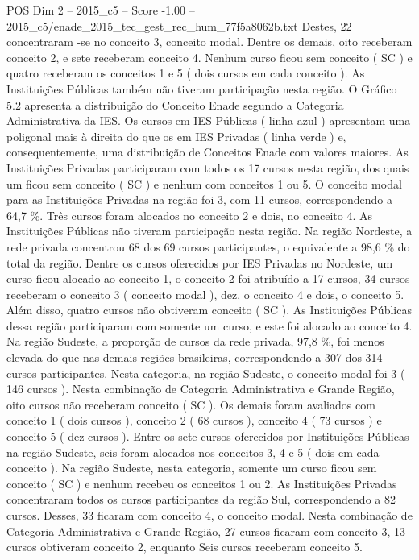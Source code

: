 \begin{textsample}{POS Dim 2 – 2015\_c5 – Score -1.00 – 2015\_c5/enade\_2015\_tec\_gest\_rec\_hum\_77f5a8062b.txt}
Destes, 22 concentraram -se no conceito 3, conceito modal.
Dentre os demais, oito receberam conceito 2, e sete receberam conceito 4.
Nenhum curso ficou sem conceito ( SC ) e quatro receberam os conceitos 1 e 5 ( dois cursos em cada conceito ).
As Instituições Públicas também não tiveram participação nesta região.
O Gráfico 5.2 apresenta a distribuição do Conceito Enade segundo a Categoria Administrativa da IES.
Os cursos em IES Públicas ( linha azul ) apresentam uma poligonal mais à direita do que os em IES Privadas ( linha verde ) e, consequentemente, uma distribuição de Conceitos Enade com valores maiores.
As Instituições Privadas participaram com todos os 17 cursos nesta região, dos quais um ficou sem conceito ( SC ) e nenhum com conceitos 1 ou 5.
O conceito modal para as Instituições Privadas na região foi 3, com 11 cursos, correspondendo a 64,7 \%.
Três cursos foram alocados no conceito 2 e dois, no conceito 4.
As Instituições Públicas não tiveram participação nesta região.
Na região Nordeste, a rede privada concentrou 68 dos 69 cursos participantes, o equivalente a 98,6 \% do total da região.
Dentre os cursos oferecidos por IES Privadas no Nordeste, um curso ficou alocado ao conceito 1, o conceito 2 foi atribuído a 17 cursos, 34 cursos receberam o conceito 3 ( conceito modal ), dez, o conceito 4 e dois, o conceito 5.
Além disso, quatro cursos não obtiveram conceito ( SC ).
As Instituições Públicas dessa região participaram com somente um curso, e este foi alocado ao conceito 4.
Na região Sudeste, a proporção de cursos da rede privada, 97,8 \%, foi menos elevada do que nas demais regiões brasileiras, correspondendo a 307 dos 314 cursos participantes.
Nesta categoria, na região Sudeste, o conceito modal foi 3 ( 146 cursos ).
Nesta combinação de Categoria Administrativa e Grande Região, oito cursos não receberam conceito ( SC ).
Os demais foram avaliados com conceito 1 ( dois cursos ), conceito 2 ( 68 cursos ), conceito 4 ( 73 cursos ) e conceito 5 ( dez cursos ).
Entre os sete cursos oferecidos por Instituições Públicas na região Sudeste, seis foram alocados nos conceitos 3, 4 e 5 ( dois em cada conceito ).
Na região Sudeste, nesta categoria, somente um curso ficou sem conceito ( SC ) e nenhum recebeu os conceitos 1 ou 2.
As Instituições Privadas concentraram todos os cursos participantes da região Sul, correspondendo a 82 cursos.
Desses, 33 ficaram com conceito 4, o conceito modal.
Nesta combinação de Categoria Administrativa e Grande Região, 27 cursos ficaram com conceito 3, 13 cursos obtiveram conceito 2, enquanto Seis cursos receberam conceito 5.

\end{textsample}
